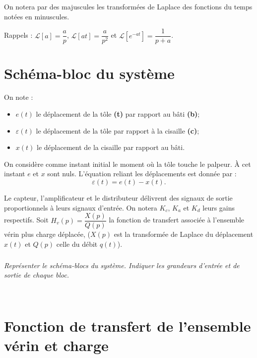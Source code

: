 \documentclass[10pt,fleqn]{article} %
\begin{document}
\begin{multicols}{2}
On notera par des majuscules les transformées de Laplace des fonctions du temps notées en minuscules.

Rappels : $\mathcal{L}\left[a\right]=\dfrac{a}{p}$, $\mathcal{L}\left[at\right]=\dfrac{a}{p^2}$ et $\mathcal{L}\left[e^{-at}\right]=\dfrac{1}{p+a}$. 

\fi
\section*{Schéma-bloc du système}
\ifprof
\else
On note : 
\begin{itemize}
\item $e(t)$ le déplacement de la tôle \textbf{(t)} par rapport au bâti \textbf{(b)};
\item $\varepsilon(t)$ le déplacement de la tôle par rapport à la cisaille \textbf{(c)};
\item $x(t)$ le déplacement de la cisaille par rapport au bâti. 
\end{itemize}
On considère comme instant initial le moment où la tôle touche le palpeur. À cet instant $e$ et $x$ sont nuls. L'équation reliant les déplacements est donnée par :
$$\varepsilon(t)=e(t)-x(t).$$


Le capteur, l'amplificateur et le distributeur délivrent des signaux de sortie proportionnels à leurs signaux d'entrée. On notera $K_c$, $K_a$ et $K_d$ leurs gains respectifs. 
Soit  $H_v(p)=\dfrac{X(p)}{Q(p)}$ la fonction de transfert associée à l'ensemble vérin plus charge déplacée, ($X(p)$ est la transformée de Laplace du déplacement $x(t)$ et $Q(p)$ celle du débit $q(t)$).
\fi
\subparagraph{}\textit{Représenter le schéma-blocs du système. Indiquer les grandeurs d'entrée et de sortie de chaque bloc.}

\ifprof \begin{corrige}~\\

\begin{center}

\end{center}
\end{corrige} \else \fi

\section*{Fonction de transfert de l'ensemble vérin et charge}

\end{multicols}
\end{document}
